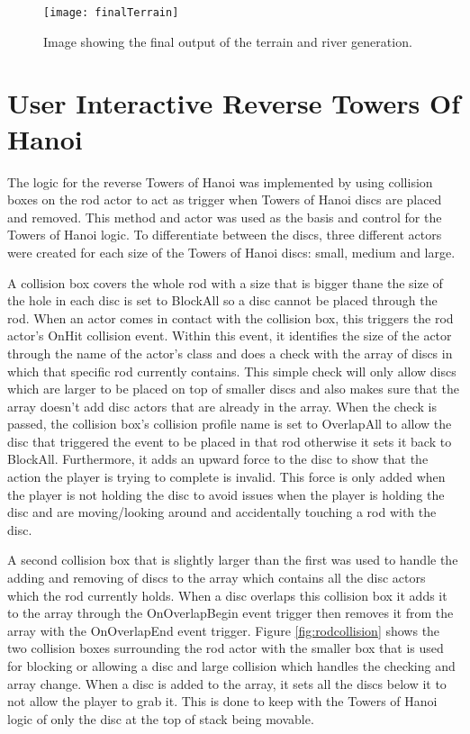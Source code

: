 \begin{figure}[H]
	\texttt{[image: finalTerrain]}
	\centering
	\caption{Image showing the final output of the terrain and river generation.}
	\label{fig:finalTerrain}
\end{figure}
\clearpage

\section{User Interactive Reverse Towers Of Hanoi}
The logic for the reverse Towers of Hanoi was implemented by using collision boxes on the rod actor to act as trigger when Towers of Hanoi discs are placed and removed. This method and actor was used as the basis and control for the Towers of Hanoi logic. To differentiate between the discs, three different actors were created for each size of the Towers of Hanoi discs: small, medium and large. 
\newline
\par
A collision box covers the whole rod with a size that is bigger thane the size of the hole in each disc is set to BlockAll so a disc cannot be placed through the rod. When an actor comes in contact with the collision box, this triggers the rod actor's OnHit collision event. Within this event, it identifies the size of the actor through the name of the actor's class and does a check with the array of discs in which that specific rod currently contains. This simple check will only allow discs which are larger to be placed on top of smaller discs and also makes sure that the array doesn't add disc actors that are already in the array. When the check is passed, the collision box's collision profile name is set to OverlapAll to allow the disc that triggered the event to be placed in that rod otherwise it sets it back to BlockAll. Furthermore, it adds an upward force to the disc to show that the action the player is trying to complete is invalid. This force is only added when the player is not holding the disc to avoid issues when the player is holding the disc and are moving/looking around and accidentally touching a rod with the disc.
\newline
\par
A second collision box that is slightly larger than the first was used to handle the adding and removing of discs to the array which contains all the disc actors which the rod currently holds. When a disc overlaps this collision box it adds it to the array through the OnOverlapBegin event trigger then removes it from the array with the OnOverlapEnd event trigger. Figure \ref{fig:rodcollision} shows the two collision boxes surrounding the rod actor with the smaller box that is used for blocking or allowing a disc and large collision which handles the checking and array change. When a disc is added to the array, it sets all the discs below it to not allow the player to grab it. This is done to keep with the Towers of Hanoi logic of only the disc at the top of stack being movable.

